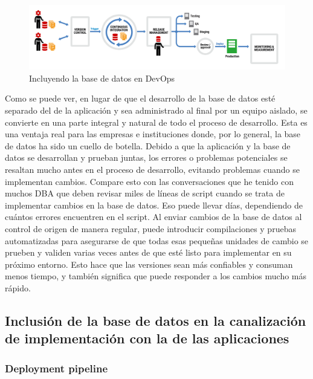 \documentclass[preprint,12pt]{elsarticle}
\begin{document}
\begin{figure}[htb]
	\begin{center}
		\includegraphics[width=14cm]{./IMAGENES/basededatos_1} 
		\caption{Incluyendo la base de datos en DevOps}
	\end{center}
\end{figure}

Como se puede ver, en lugar de que el desarrollo de la base de datos esté separado del de la aplicación y sea administrado al final por un equipo aislado, se convierte en una parte integral y natural de todo el proceso de desarrollo. Esta es una ventaja real para las empresas e instituciones donde, por lo general, la base de datos ha sido un cuello de botella. Debido a que la aplicación y la base de datos se desarrollan y prueban juntas, los errores o problemas potenciales se resaltan mucho antes en el proceso de desarrollo, evitando problemas cuando se implementan cambios. Compare esto con las conversaciones que he tenido con muchos DBA que deben revisar miles de líneas de script cuando se trata de implementar cambios en la base de datos. Eso puede llevar días, dependiendo de cuántos errores encuentren en el script. Al enviar cambios de la base de datos al control de origen de manera regular, puede introducir compilaciones y pruebas automatizadas para asegurarse de que todas esas pequeñas unidades de cambio se prueben y validen varias veces antes de que esté listo para implementar en su próximo entorno. Esto hace que las versiones sean más confiables y consuman menos tiempo, y también significa que puede responder a los cambios mucho más rápido. \cite{DevopsBD2}\\

\subsection{\textbf{Inclusión de la base de datos en la canalización de implementación con la de las aplicaciones}}

\subsubsection{\textbf{Deployment pipeline}}
\end{document}
